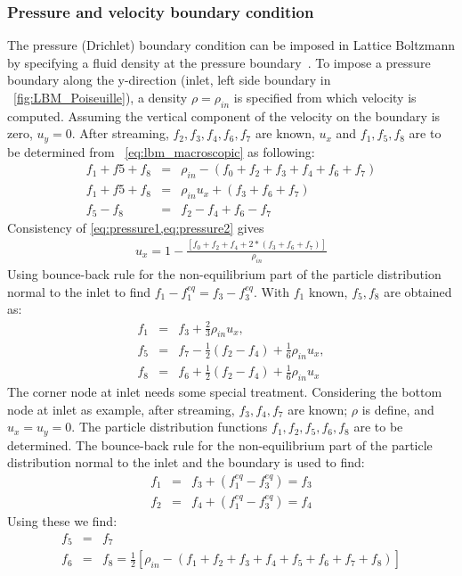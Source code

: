 \subsubsection*{Pressure and velocity boundary condition}
The pressure (Drichlet) boundary condition can be imposed in Lattice Boltzmann by specifying a fluid density at the pressure boundary~\citep{Zou1997}. To impose a pressure boundary along the y-direction (inlet, left side boundary in ~\cref{fig:LBM_Poiseuille}), a density $\rho = \rho_{in}$ is specified from which velocity is computed. Assuming the vertical component of the velocity on the boundary is zero, $u_y=0$. After streaming, $f_2, f_3, f_4, f_6, f_7$ are known, $u_x$ and $f_1, f_5, f_8$ are to be determined from ~\cref{eq:lbm_macroscopic} as following:
\begin{eqnarray}
f_1+f5+f_8 & = & \rho_{in} - (f_0+f_2+f_3+f_4+f_6+f_7) \label{eq:pressure1}\\
f_1+f5+f_8 & = & \rho_{in}u_x + (f_3+f_6+f_7) \label{eq:pressure2} \\
f_5 - f_8  & = & f_2 - f_4 +f_6 -f_7
\end{eqnarray}
\noindent Consistency of \cref{eq:pressure1,eq:pressure2} gives
\begin{eqnarray}
u_x = 1 - \frac{[f_0+f_2+f_4+2*(f_3+f_6+f_7)]}{\rho_{in}}
\end{eqnarray}
Using bounce-back rule for the non-equilibrium part of the particle distribution normal to the inlet to find $f_1 -f_1^{eq} = f_3 -f_3^{eq}$. With $f_1$ known, $f_5,f_8$ are obtained as:
\begin{eqnarray}
f_1 & = & f_3 + \frac{2}{3} \rho_{in}u_x, \nonumber \\ 
f_5 & = & f_7 - \frac{1}{2}(f_2 - f_4) + \frac{1}{6}\rho_{in}u_x,\nonumber \\ 
f_8 & = & f_6 + \frac{1}{2}(f_2 - f_4) + \frac{1}{6}\rho_{in}u_x
\end{eqnarray}
The corner node at inlet needs some special treatment. Considering the bottom node at inlet as example, after streaming, $f_3, f_4, f_7$ are known; $\rho$ is define, and $u_x = u_y = 0$. The particle distribution functions $f_1, f_2, f_5, f_6, f_8$ are to be determined. The bounce-back rule for the non-equilibrium part of the particle distribution normal to the inlet and the boundary is used to find:
\begin{eqnarray}
f_1 & = & f_3 + (f_1^{eq}-f_3^{eq}) = f_3 \\
f_2 & = & f_4 + (f_1^{eq}-f_3^{eq}) = f_4
\end{eqnarray}
\noindent Using these we find: 
\begin{eqnarray}
f_5 & = & f_7 \\
f_6 & = & f_8 = \frac{1}{2}[\rho_{in} - (f_1 + f_2 + f_3 + f_4 + f_5 + f_6 + f_7 + f_8)]
\end{eqnarray}

